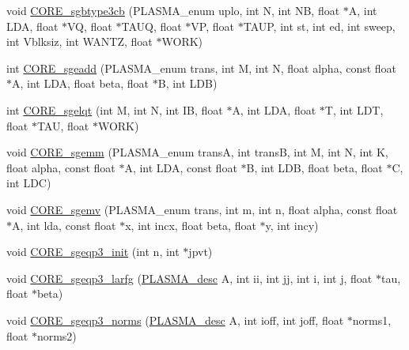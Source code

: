 \begin{DoxyCompactItemize}
\item 
void \hyperlink{group__CORE__float_ga1f548eb7875fe947116526b254f264cc_ga1f548eb7875fe947116526b254f264cc}{C\+O\+R\+E\+\_\+sgbtype3cb} (P\+L\+A\+S\+M\+A\+\_\+enum uplo, int N, int N\+B, float $\ast$A, int L\+D\+A, float $\ast$V\+Q, float $\ast$T\+A\+U\+Q, float $\ast$V\+P, float $\ast$T\+A\+U\+P, int st, int ed, int sweep, int Vblksiz, int W\+A\+N\+T\+Z, float $\ast$W\+O\+R\+K)
\item 
int \hyperlink{group__CORE__float_gaa7601056d7dda8b493c26a89c01100f7_gaa7601056d7dda8b493c26a89c01100f7}{C\+O\+R\+E\+\_\+sgeadd} (P\+L\+A\+S\+M\+A\+\_\+enum trans, int M, int N, float alpha, const float $\ast$A, int L\+D\+A, float beta, float $\ast$B, int L\+D\+B)
\item 
int \hyperlink{group__CORE__float_ga1a3e6f13bfd3cb744f30dff09d3bb32d_ga1a3e6f13bfd3cb744f30dff09d3bb32d}{C\+O\+R\+E\+\_\+sgelqt} (int M, int N, int I\+B, float $\ast$A, int L\+D\+A, float $\ast$T, int L\+D\+T, float $\ast$T\+A\+U, float $\ast$W\+O\+R\+K)
\item 
void \hyperlink{group__CORE__float_gae4a3490c68ca2540bf5d3f153fead868_gae4a3490c68ca2540bf5d3f153fead868}{C\+O\+R\+E\+\_\+sgemm} (P\+L\+A\+S\+M\+A\+\_\+enum trans\+A, int trans\+B, int M, int N, int K, float alpha, const float $\ast$A, int L\+D\+A, const float $\ast$B, int L\+D\+B, float beta, float $\ast$C, int L\+D\+C)
\item 
void \hyperlink{group__CORE__float_gaed7cf28cd52e9600153facede8298aaa_gaed7cf28cd52e9600153facede8298aaa}{C\+O\+R\+E\+\_\+sgemv} (P\+L\+A\+S\+M\+A\+\_\+enum trans, int m, int n, float alpha, const float $\ast$A, int lda, const float $\ast$x, int incx, float beta, float $\ast$y, int incy)
\item 
void \hyperlink{group__CORE__float_ga433180f7cb5990f8a9380514e37e23fe_ga433180f7cb5990f8a9380514e37e23fe}{C\+O\+R\+E\+\_\+sgeqp3\+\_\+init} (int n, int $\ast$jpvt)
\item 
void \hyperlink{group__CORE__float_gad834f13015ce87ea51e6ac35c5e0d861_gad834f13015ce87ea51e6ac35c5e0d861}{C\+O\+R\+E\+\_\+sgeqp3\+\_\+larfg} (\hyperlink{structplasma__desc__t}{P\+L\+A\+S\+M\+A\+\_\+desc} A, int ii, int jj, int i, int j, float $\ast$tau, float $\ast$beta)
\item 
void \hyperlink{group__CORE__float_ga1293b5079eedb8d03f20bd3f2f6b9675_ga1293b5079eedb8d03f20bd3f2f6b9675}{C\+O\+R\+E\+\_\+sgeqp3\+\_\+norms} (\hyperlink{structplasma__desc__t}{P\+L\+A\+S\+M\+A\+\_\+desc} A, int ioff, int joff, float $\ast$norms1, float $\ast$norms2)
\item 

\end{DoxyCompactItemize}
